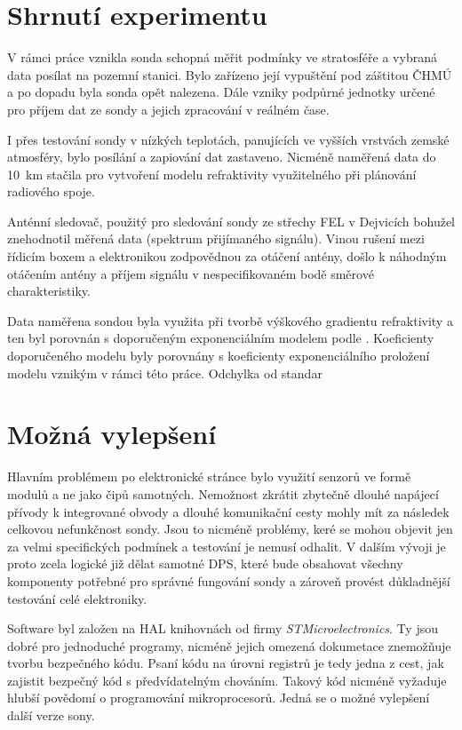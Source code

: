 \documentclass[twoside]{ctuthesis}
\theoremstyle{plain}
\theoremstyle{definition}
\theoremstyle{note}
\begin{document}
	\section{Shrnutí experimentu}
	V rámci práce vznikla sonda schopná měřit podmínky ve stratosféře a vybraná data posílat na pozemní stanici. Bylo zařízeno její vypuštění pod záštitou ČHMÚ a po dopadu byla sonda opět nalezena. Dále vzniky podpůrné jednotky určené pro příjem dat ze sondy a jejich zpracování v reálném čase.

	I přes testování sondy v nízkých teplotách, panujících ve vyšších vrstvách zemské atmosféry, bylo posílání a zapiování dat zastaveno. Nicméně naměřená data do 10~km stačila pro vytvoření modelu refraktivity využitelného při plánování radiového spoje.

	Anténní sledovač, použitý pro sledování sondy ze střechy FEL v Dejvicích bohužel znehodnotil měřená data (spektrum přijímaného signálu). Vinou rušení mezi řídicím boxem a elektronikou zodpovědnou za otáčení antény, došlo k náhodným otáčením antény a příjem signálu v nespecifikovaném bodě směrové charakteristiky. 

	Data naměřena sondou byla využita při tvorbě výškového gradientu refraktivity a ten byl porovnán s doporučeným exponenciálním modelem podle \cite{ITU:refrac}. Koeficienty doporučeného modelu byly porovnány s koeficienty exponenciálního proložení modelu vznikým v rámci této práce. Odchylka od standar



	\section{Možná vylepšení}
	Hlavním problémem po elektronické stránce bylo využití senzorů ve formě modulů a ne jako čipů samotných. Nemožnost zkrátit zbytečně dlouhé napájecí přívody k integrované obvody a dlouhé komunikační cesty mohly mít za následek celkovou nefunkčnost sondy. Jsou to nicméně problémy, keré se mohou objevit jen za velmi specifických podmínek a testování je nemusí odhalit. V dalším vývoji je proto zcela logické již dělat samotné DPS, které bude obsahovat všechny komponenty potřebné pro správné fungování sondy a zároveň provést důkladnější testování celé elektroniky.

	Software byl založen na HAL knihovnách od firmy \textit{STMicroelectronics}. Ty jsou dobré pro jednoduché programy, nicméně jejich omezená dokumetace znemožňuje tvorbu bezpečného kódu. Psaní kódu na úrovni registrů je tedy jedna z cest, jak zajistit bezpečný kód s předvídatelným chováním. Takový kód nicméně vyžaduje hlubší povědomí o programování mikroprocesorů. Jedná se o možné vylepšení další verze sony.
\end{document}
